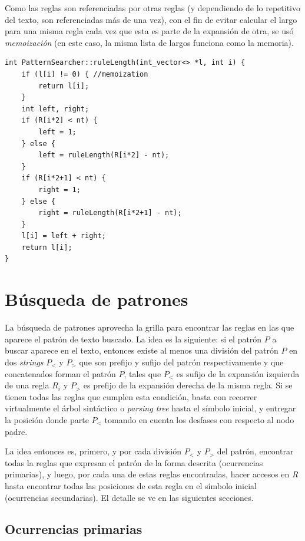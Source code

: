 Como las reglas son referenciadas por otras reglas (y dependiendo de lo repetitivo del texto, son referenciadas más de una vez), con el fin de evitar calcular el largo para una misma regla cada vez que esta es parte de la expansión de otra, se usó \textit{memoización} (en este caso, la misma lista de largos funciona como la memoria).

\begin{lstlisting}[style=cppstyle]
int PatternSearcher::ruleLength(int_vector<> *l, int i) {
    if (l[i] != 0) { //memoization
        return l[i];
    }
    int left, right;
    if (R[i*2] < nt) {
        left = 1;
    } else {
        left = ruleLength(R[i*2] - nt);
    }
    if (R[i*2+1] < nt) {
        right = 1;
    } else {
        right = ruleLength(R[i*2+1] - nt);
    }
    l[i] = left + right;
    return l[i];
}
\end{lstlisting}

\section{Búsqueda de patrones}

La búsqueda de patrones aprovecha la grilla para encontrar las reglas en las que aparece el patrón de texto buscado. La idea es la siguiente: si el patrón $P$ a buscar aparece en el texto, entonces existe al menos una división del patrón $P$ en dos \textit{strings} $P_<$ y $P_>$ que son prefijo y sufijo del patrón respectivamente y que concatenados forman el patrón $P$, tales que $P_<$ es sufijo de la expansión izquierda de una regla $R_i$ y $P_>$ es prefijo de la expansión derecha de la misma regla. Si se tienen todas las reglas que cumplen esta condición, basta con recorrer virtualmente el árbol sintáctico o \textit{parsing tree} hasta el símbolo inicial, y entregar la posición donde parte $P_<$ tomando en cuenta los desfases con respecto al nodo padre. 

La idea entonces es, primero, y por cada división $P_<$ y $P_>$ del patrón, encontrar todas la reglas que expresan el patrón de la forma descrita (ocurrencias primarias), y luego, por cada una de estas reglas encontradas, hacer accesos en \textit{R} hasta encontrar todas las posiciones de esta regla en el símbolo inicial (ocurrencias secundarias). El detalle se ve en las siguientes secciones.

\subsection{Ocurrencias primarias}

